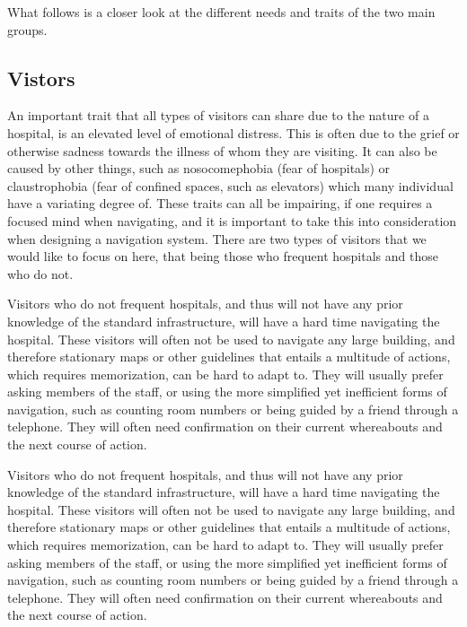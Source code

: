 What follows is a closer look at the different needs and traits of the two main groups.

\subsection{Vistors} %
 \label{par:vistors}
 
An important trait that all types of visitors can share due to the nature of a hospital, is an elevated level of emotional distress. This is often due to the grief or otherwise sadness towards the illness of whom they are visiting. It can also be caused by other things, such as nosocomephobia (fear of hospitals) or claustrophobia (fear of confined spaces, such as elevators) which many individual have a variating degree of.\cite{individforskellige} These traits can all be impairing, if one requires a focused mind when navigating, and it is important to take this into consideration when designing a navigation system. There are two types of visitors that we would like to focus on here, that being those who frequent hospitals and those who do not.

Visitors who do not frequent hospitals, and thus will not have any prior knowledge of the standard infrastructure, will have a hard time navigating the hospital. These visitors will often not be used to navigate any large building, and therefore stationary maps or other guidelines that entails a multitude of actions, which requires memorization, can be hard to adapt to. They will usually prefer asking members of the staff, or using the more simplified yet inefficient forms of navigation, such as counting room numbers or being guided by a friend through a telephone. They will often need confirmation on their current whereabouts and the next course of action.\cite{naturtalenter}\cite{individforskelle}

Visitors who do not frequent hospitals, and thus will not have any prior knowledge of the standard infrastructure, will have a hard time navigating the hospital. These visitors will often not be used to navigate any large building, and therefore stationary maps or other guidelines that entails a multitude of actions, which requires memorization, can be hard to adapt to. They will usually prefer asking members of the staff, or using the more simplified yet inefficient forms of navigation, such as counting room numbers or being guided by a friend through a telephone. They will often need confirmation on their current whereabouts and the next course of action.\cite{naturtalenter}\cite{individforskellige}

